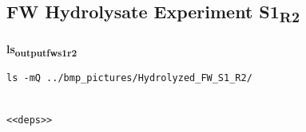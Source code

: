 \documentclass[11pt]{article}
\begin{document}
\subsection{FW Hydrolysate Experiment S1\textsubscript{R2}}
\label{sec:org760ea86}
\textbf{ls\textsubscript{output}\textsubscript{fw}\textsubscript{s1}\textsubscript{r2}}
\begin{verbatim}
ls -mQ ../bmp_pictures/Hydrolyzed_FW_S1_R2/
\end{verbatim}

\begin{verbatim}

<<deps>>

\end{verbatim}

\begin{verbatim}


\end{verbatim}
\end{document}

